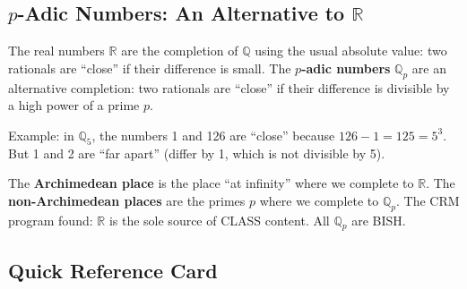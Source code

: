 \documentclass[11pt,twoside,openany]{report}
\theoremstyle{remark}
\newcommand{\BISH}{\textsf{BISH}}
\newcommand{\CLASS}{\textsf{CLASS}}
\begin{document}
\subsection*{$p$-Adic Numbers: An Alternative to $\mathbb{R}$}

The real numbers $\mathbb{R}$ are the completion of $\mathbb{Q}$ using the usual absolute value: two rationals are ``close'' if their difference is small. The \textbf{$p$-adic numbers} $\mathbb{Q}_p$ are an alternative completion: two rationals are ``close'' if their difference is divisible by a high power of a prime $p$.

Example: in $\mathbb{Q}_5$, the numbers 1 and 126 are ``close'' because $126 - 1 = 125 = 5^3$. But 1 and 2 are ``far apart'' (differ by 1, which is not divisible by 5).

The \textbf{Archimedean place} is the place ``at infinity'' where we complete to $\mathbb{R}$. The \textbf{non-Archimedean places} are the primes $p$ where we complete to $\mathbb{Q}_p$. The CRM program found: $\mathbb{R}$ is the sole source of \CLASS{} content. All $\mathbb{Q}_p$ are \BISH.

\subsection*{Quick Reference Card}
\end{document}
